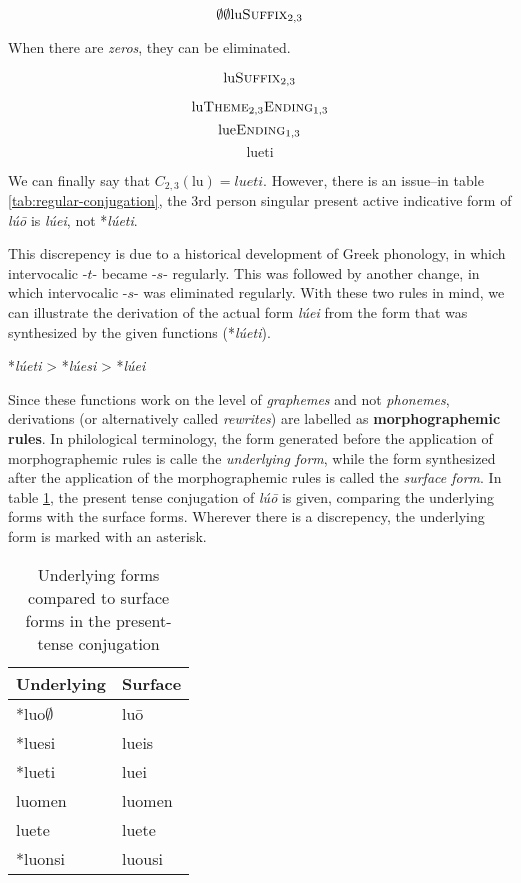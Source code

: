 \documentclass[12pt]{article}
\begin{document}
\[\emptyset\emptyset\text{lu}\textsc{Suffix}_{2,3}\]

When there are \emph{zeros}, they can be eliminated.

\[\text{lu}\textsc{Suffix}_{2,3}\]

\[\text{lu}\textsc{Theme}_{2,3}\textsc{Ending}_{1,3}\]
\[\text{lue}\textsc{Ending}_{1,3}\]
\[\text{lueti}\]

We can finally say that $C_{2,3}(\text{lu}) = \textit{lueti}$. However, there
is an issue--in table \ref{tab:regular-conjugation}, the 3rd person singular
present active indicative form of \textit{l\'{u}\={o}} is \textit{l\'{u}ei},
not *\textit{l\'{u}eti}. 

This discrepency is due to a historical development of Greek phonology, in
which intervocalic -$t$- became -$s$- regularly. This was followed by another
change, in which intervocalic -$s$- was eliminated regularly. With these two
rules in mind, we can illustrate the derivation of the actual form
\textit{l\'{u}ei} from the form that was synthesized by the given functions
(*\textit{l\'{u}eti}).

\centerline{*\textit{l\'{u}eti} > *\textit{l\'{u}esi} > *\textit{l\'{u}ei}}

Since these functions work on the level of \textit{graphemes} and not \textit{phonemes},
derivations (or alternatively called \emph{rewrites}) are labelled as
\textbf{morphographemic rules}. In philological terminology, the form generated
before the application of morphographemic rules is calle the \textit{underlying form},
while the form synthesized after the application of the morphographemic rules is
called the \textit{surface form}. In table \ref{tab:underlying}, the present tense
conjugation of \textit{l\'{u}\={o}} is given, comparing the underlying forms with
the surface forms. Wherever there is a discrepency, the underlying form is marked with
an asterisk.

\begin{table}
\centering
\begin{tabular}{|l l|}
    \hline
    \textbf{Underlying} & \textbf{Surface}\\
    \hline
    *luo$\emptyset$ & lu\={o}\\
    *luesi   & lueis\\
    *lueti   & luei\\
    luomen   & luomen\\
    luete    & luete\\
    *luonsi  & luousi\\
    \hline
\end{tabular}
\caption{Underlying forms compared to surface forms in the present-tense
    conjugation}
\label{tab:underlying}
\end{table}
\end{document}
